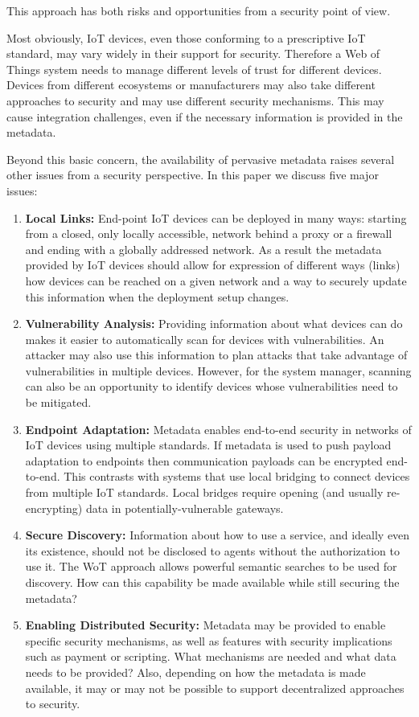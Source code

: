 This approach has both risks and opportunities from a security point of view.

Most obviously, IoT devices, even those conforming to a prescriptive IoT standard,
may vary widely in their support for security.
Therefore a Web of Things system
needs to manage different levels of trust for different devices.
Devices from different ecosystems or manufacturers may also take different approaches to
security and may use different security mechanisms. 
This may cause integration challenges, even if the necessary
information is provided in the metadata.

Beyond this basic concern,
the availability of pervasive metadata raises several other issues
from a security perspective.
In this paper we discuss five major issues:
\begin{enumerate}
\item \textbf{Local Links:}
End-point IoT devices can be deployed in many ways: starting from a closed, only locally accessible,
network behind a proxy or a firewall and ending with a globally addressed network. 
As a result the metadata provided by IoT devices should allow for expression of
different ways (links) how devices can be reached on a given network
and a way to securely update this information when the deployment setup changes. 
\item \textbf{Vulnerability Analysis:}
Providing information about what devices can do makes it easier to 
automatically scan for devices with vulnerabilities.
An attacker may also use this information to plan attacks that take advantage of 
vulnerabilities in multiple devices. 
However, for the system manager, scanning can also be an opportunity 
to identify devices whose vulnerabilities need to be mitigated.
\item \textbf{Endpoint Adaptation:}
Metadata enables end-to-end security in networks of IoT devices using multiple standards.
If metadata is used to push payload adaptation to endpoints then 
communication payloads can be encrypted end-to-end.  
This contrasts with systems that use local bridging to connect devices from multiple IoT standards.
Local bridges require opening (and usually re-encrypting) data in potentially-vulnerable gateways.
\item \textbf{Secure Discovery:}
Information about how to use a service, 
and ideally even its existence, should not
be disclosed to agents without the authorization to use it.
The WoT approach allows powerful semantic searches to be used for discovery.
How can this capability be made available while still securing the metadata?
\item \textbf{Enabling Distributed Security:}
Metadata may be provided to enable specific security mechanisms,
as well as features with security implications such as payment or scripting.
What mechanisms are needed and what data needs to be provided?
Also, depending on how the metadata is made available, it may or may not be 
possible to support decentralized approaches to security.
\end{enumerate}

